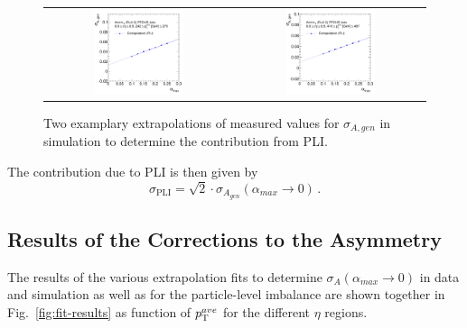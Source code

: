 \begin{figure}[!tp]
  \centering
  \begin{tabular}{cc}
                \includegraphics[width=0.49\textwidth]{figures/Extrapol_Eta0_pt4_gen_final_nominal_v4.pdf} &
                \includegraphics[width=0.49\textwidth]{figures/Extrapol_Eta0_pt9_gen_final_nominal_v4.pdf}
  \end{tabular}
  \caption{Two examplary extrapolations of measured values for $\sigma_{A,gen}$ in simulation to determine the contribution from PLI.}
  \label{fig:extrapol_gen}
\end{figure}
The contribution due to PLI is then given by
 \begin{equation}
 \label{eq:pli}
 \sigma_\mathrm{PLI} = \sqrt{2} \cdot \sigma_{A_{gen}}(\alpha_{max} \rightarrow 0) \, .
 \end{equation}

\subsection{Results of the Corrections to the Asymmetry}
\label{subsec:jer_corrections_results} 
The results of the various extrapolation fits to determine $ \sigma_{A}(\alpha_{max} \rightarrow 0)$ in data and simulation as well as for the particle-level imbalance are shown together in Fig.~\ref{fig:fit-results} as function of $\pt^{ave}$ for the different $\eta$ regions. 

